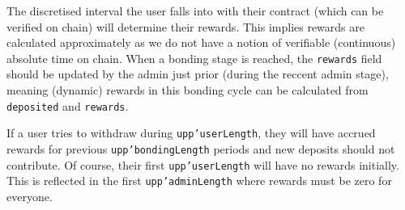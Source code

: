 \documentclass[10pt, a4paper]{article}
\theoremstyle{definition}
\begin{document}
The discretised interval the user falls into with their contract (which can be verified on chain)  will determine their rewards. This implies rewards are calculated approximately as we do not have a notion of verifiable (continuous) absolute time on chain. When a bonding stage is reached, the \texttt{rewards} field should be updated by the admin just prior (during the reccent admin stage), meaning (dynamic) rewards in this bonding cycle can be calculated from \texttt{deposited} and \texttt{rewards}.

If a user tries to withdraw during \texttt{upp'userLength}, they will have accrued rewards for previous \texttt{upp'bondingLength} periods and new deposits should not contribute. Of course, their first \texttt{upp'userLength} will have no rewards initially. This is reflected in the first \texttt{upp'adminLength} where rewards must be zero for everyone.
\end{document}
